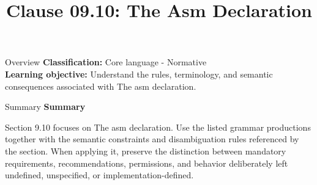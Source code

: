 \documentclass[10pt,letterpaper]{article}
\title{Clause 09.10: The Asm Declaration}
\author{}
\date{}
\begin{document}
\maketitle
\begin{CornellOverviewBox}{Overview}
\textbf{Classification:} Core language - Normative\\[2pt]
\textbf{Learning objective:} Understand the rules, terminology, and semantic consequences associated with The asm declaration.
\end{CornellOverviewBox}\begin{CornellSummaryBox}{Summary}
{\sffamily\bfseries\color{Accent} Summary}\par\vspace{3pt}Section 9.10 focuses on The asm declaration. Use the listed grammar productions together with the semantic constraints and disambiguation rules referenced by the section. When applying it, preserve the distinction between mandatory requirements, recommendations, permissions, and behavior deliberately left undefined, unspecified, or implementation-defined.
\end{CornellSummaryBox}
\end{document}
